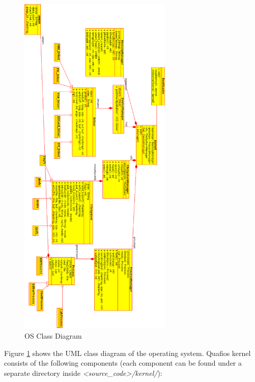 \documentclass[oneside]{book}
\begin{document}
\begin{figure}[H]
\begin{center}
\includegraphics[width=0.65\textwidth]{os.png}
\end{center}
\caption{OS Class Diagram}
\label{os}
\end{figure}

Figure \ref{os} shows the UML class diagram of the operating system. Quafios
kernel consists of the following components (each component can be
found under a separate directory inside \textit{<source\_code>/kernel/}):
\end{document}
